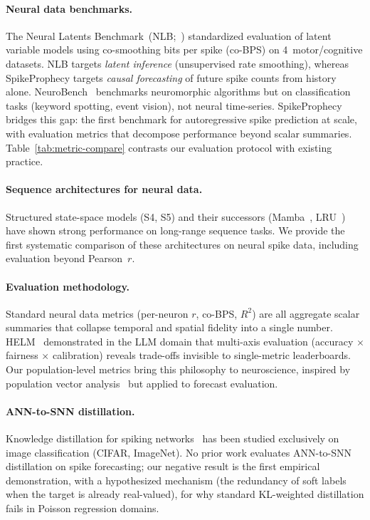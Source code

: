 \documentclass{article}
\begin{document}
\paragraph{Neural data benchmarks.}
The Neural Latents Benchmark~(NLB;~\citealt{pei2021nlb}) standardized
evaluation of latent variable models using co-smoothing bits per spike
(co-BPS) on 4~motor/cognitive datasets.  NLB targets \emph{latent
inference} (unsupervised rate smoothing), whereas SpikeProphecy targets
\emph{causal forecasting} of future spike counts from history alone.
NeuroBench~\citep{yik2024neurobench} benchmarks neuromorphic algorithms
but on classification tasks (keyword spotting, event vision), not
neural time-series.  SpikeProphecy bridges this gap: the first
benchmark for autoregressive spike prediction at scale, with
evaluation metrics that decompose performance beyond scalar summaries.
Table~\ref{tab:metric-compare} contrasts our evaluation protocol with
existing practice.

\paragraph{Sequence architectures for neural data.}
Structured state-space models (S4, S5) and their successors
(Mamba~\citep{gu2023mamba}, LRU~\citep{orvieto2023resurrecting}) have shown
strong performance on long-range sequence tasks.  We provide the first
systematic comparison of these architectures on neural spike data,
including evaluation beyond Pearson~$r$.

\paragraph{Evaluation methodology.}
Standard neural data metrics (per-neuron $r$, co-BPS, $R^2$) are all
aggregate scalar summaries that collapse temporal and spatial fidelity
into a single number.  HELM~\citep{liang2023helm} demonstrated in the
LLM domain that multi-axis evaluation (accuracy $\times$ fairness
$\times$ calibration) reveals trade-offs invisible to single-metric
leaderboards.  Our population-level metrics bring this philosophy to
neuroscience, inspired by population vector
analysis~\citep{georgopoulos1986neuronal} but applied to forecast
evaluation.

\paragraph{ANN-to-SNN distillation.}
Knowledge distillation for spiking networks~\citep{hong2023lasnn} has
been studied exclusively on image classification (CIFAR, ImageNet).
No prior work evaluates ANN-to-SNN distillation on spike forecasting;
our negative result is the first empirical demonstration, with a
hypothesized mechanism (the redundancy of soft labels when the target
is already real-valued), for why standard KL-weighted distillation
fails in Poisson regression domains.
\end{document}
